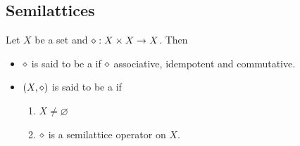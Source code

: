 \documentclass{book}
\begin{document}
	
	
	
	
	
	
	
	
	
	
	
	
	
	
	
	
	
	
	
	
	
	
	
	
	
	
	
	
	
	
	
	
	
	
	
	
	
	
	
	
	
	
	
	
	
	
	
	
	
	
	
	
	
	
	
	
	
	
	
	
	
	
	
	
	
	
	
	
	
	
	
	
	
	
	
	
	
	
	
	
	
	
	
	
	
	
	
	
	\newpage
	\subsection{Semilattices}
	
	\begin{defn} 
		Let $X$ be a set and $\diamond:X \times X \rightarrow X$. 
		Then 
		\begin{itemize}
			\item $\diamond$ is said to be a  if $\diamond$ associative, idempotent and commutative.
			\item $(X, \diamond)$ is said to be a  if 
			\begin{enumerate}
				\item $X \neq \varnothing$
				\item $\diamond$ is a semilattice operator on $X$.
			\end{enumerate}
		\end{itemize}
	\end{defn}
	
\end{document}
